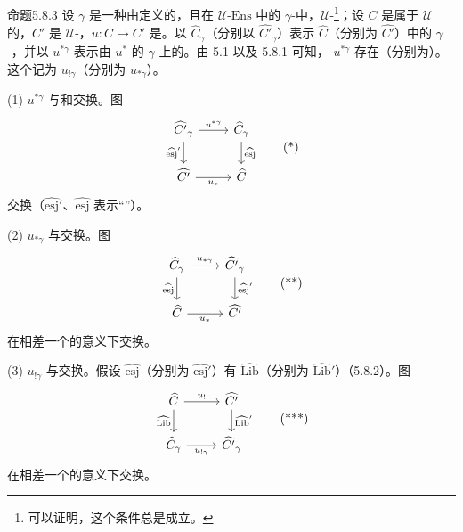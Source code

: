 \begin{SGAresult}{命题}{5.8.3}
设 $\gamma$ 是一种由定义的，且在 $\mathcal U\text{-}\mathrm{Ens}$ 中的 $\gamma$-中，$\mathcal U$-\footnote[3]{可以证明，这个条件总是成立。}；设 $C$ 是属于 $\mathcal U$ 的，$C'$ 是 $\mathcal U$-，$u:C\to C'$ 是。以 $\widehat C_\gamma$（分别以 $\widehat{C'}_\gamma$）表示 $\widehat C$（分别为 $\widehat{C'}$）中的 $\gamma$-，并以 $u^{*\gamma}$ 表示由 $u^*$ 的 $\gamma$-上的。由 5.1 以及 5.8.1 可知， $u^{*\gamma}$ 存在（分别为）。这个记为 $u_{!\gamma}$（分别为 $u_{*\gamma}$）。

(1)  $u^{*\gamma}$ 与和交换。图
\[\begin{tikzcd}\widehat{C'}_\gamma\arrow[r,"u^{*\gamma}"]\arrow[d,"\widehat{\mathrm{esj}}'"']&\widehat C_\gamma\arrow[d,"\widehat{\mathrm{esj}}"]\\\widehat{C'}\arrow[r,"u_*"']&\widehat C\end{tikzcd}\tag{*}\]
交换（$\widehat{\mathrm{esj}}'$、$\widehat{\mathrm{esj}}$ 表示“”）。

(2)  $u_{*\gamma}$ 与交换。图
\[\begin{tikzcd}\widehat C_\gamma\arrow[r,"u_{*\gamma}"]\arrow[d,"\widehat{\mathrm{esj}}"']&\widehat{C'}_\gamma\arrow[d,"\widehat{\mathrm{esj}}'"]\\\widehat C\arrow[r,"u_*"']&\widehat{C'}\end{tikzcd}\tag{**}\]
在相差一个的意义下交换。

(3)  $u_{!\gamma}$ 与交换。假设 $\widehat{\mathrm{esj}}$（分别为 $\widehat{\mathrm{esj}}'$）有 $\widehat{\mathrm{Lib}}$（分别为 $\widehat{\mathrm{Lib}}'$）（5.8.2）。图
\[\begin{tikzcd}\widehat C\arrow[r,"u_!"]\arrow[d,"\widehat{\mathrm{Lib}}"']&\widehat{C'}\arrow[d,"\widehat{\mathrm{Lib}}'"]\\\widehat C_\gamma\arrow[r,"u_{!\gamma}"']&\widehat{C'}_\gamma\end{tikzcd}\tag{***}\]
在相差一个的意义下交换。


\end{SGAresult}
